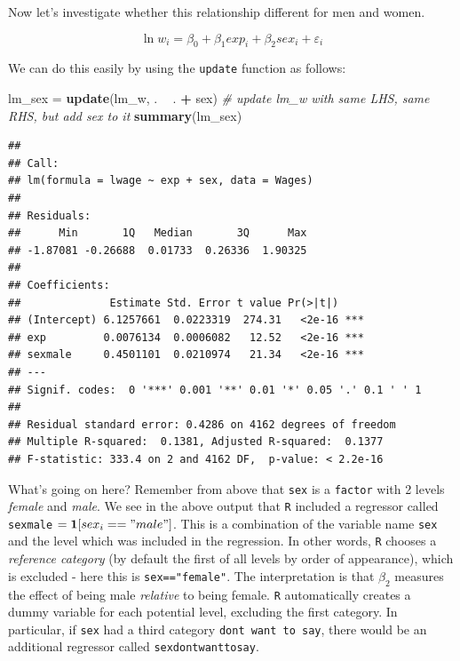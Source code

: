 \documentclass[]{book}
\newenvironment{Shaded}{\begin{snugshade}}{\end{snugshade}}
\newcommand{\KeywordTok}[1]{\textcolor[rgb]{0.13,0.29,0.53}{\textbf{#1}}}
\newcommand{\StringTok}[1]{\textcolor[rgb]{0.31,0.60,0.02}{#1}}
\newcommand{\CommentTok}[1]{\textcolor[rgb]{0.56,0.35,0.01}{\textit{#1}}}
\newcommand{\OperatorTok}[1]{\textcolor[rgb]{0.81,0.36,0.00}{\textbf{#1}}}
\newcommand{\NormalTok}[1]{#1}
\theoremstyle{definition}
\theoremstyle{definition}
\theoremstyle{definition}
\theoremstyle{remark}
\begin{document}
Now let's investigate whether this relationship different for men and
women.

\[
\ln w_i = \beta_0 + \beta_1 exp_i + \beta_2 sex_i + \varepsilon_i \label{eq:wage-sex}
\]

We can do this easily by using the \texttt{update} function as follows:

\begin{Shaded}
\begin{Highlighting}[]
\NormalTok{lm_sex =}\StringTok{ }\KeywordTok{update}\NormalTok{(lm_w, . }\OperatorTok{~}\StringTok{ }\NormalTok{. }\OperatorTok{+}\StringTok{ }\NormalTok{sex)  }\CommentTok{# update lm_w with same LHS, same RHS, but add sex to it}
\KeywordTok{summary}\NormalTok{(lm_sex)}
\end{Highlighting}
\end{Shaded}

\begin{verbatim}
## 
## Call:
## lm(formula = lwage ~ exp + sex, data = Wages)
## 
## Residuals:
##      Min       1Q   Median       3Q      Max 
## -1.87081 -0.26688  0.01733  0.26336  1.90325 
## 
## Coefficients:
##              Estimate Std. Error t value Pr(>|t|)    
## (Intercept) 6.1257661  0.0223319  274.31   <2e-16 ***
## exp         0.0076134  0.0006082   12.52   <2e-16 ***
## sexmale     0.4501101  0.0210974   21.34   <2e-16 ***
## ---
## Signif. codes:  0 '***' 0.001 '**' 0.01 '*' 0.05 '.' 0.1 ' ' 1
## 
## Residual standard error: 0.4286 on 4162 degrees of freedom
## Multiple R-squared:  0.1381, Adjusted R-squared:  0.1377 
## F-statistic: 333.4 on 2 and 4162 DF,  p-value: < 2.2e-16
\end{verbatim}

What's going on here? Remember from above that \texttt{sex} is a
\texttt{factor} with 2 levels \emph{female} and \emph{male}. We see in
the above output that \texttt{R} included a regressor called
\texttt{sexmale} \(=\mathbf{1}[sex_i=="male"]\). This is a combination
of the variable name \texttt{sex} and the level which was included in
the regression. In other words, \texttt{R} chooses a \emph{reference
category} (by default the first of all levels by order of appearance),
which is excluded - here this is \texttt{sex=="female"}. The
interpretation is that \(\beta_2\) measures the effect of being male
\emph{relative} to being female. \texttt{R} automatically creates a
dummy variable for each potential level, excluding the first category.
In particular, if \texttt{sex} had a third category
\texttt{dont\ want\ to\ say}, there would be an additional regressor
called \texttt{sexdontwanttosay}.
\end{document}
